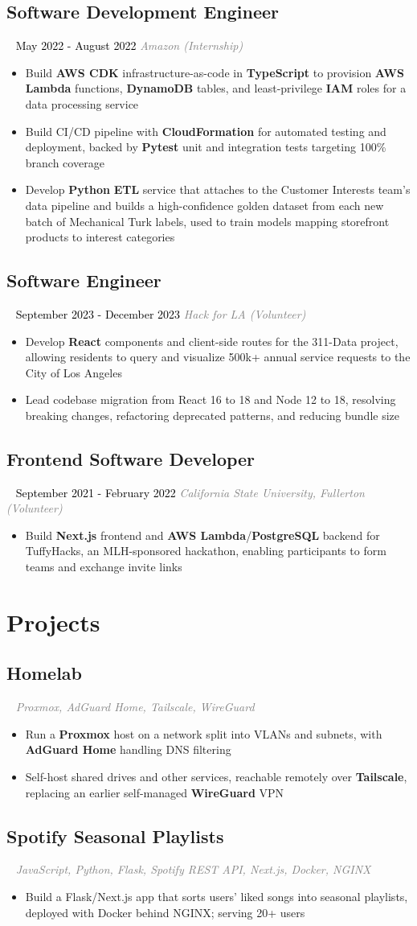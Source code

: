 \documentclass{article}
\newcommand{\resumesection}[3]{
    \subsection*{#1}
    \ 
    \normalsize
    \normalsize
    \hfill
    \textcolor{black}{#3}
    \normalsize
    \newline
    \small
    \textcolor{grey}{\emph{#2}}
}
\newcommand{\projectsection}[3]{
    \subsection*{#1}
    \ 
    \small
    \textcolor{grey}{\emph{#2}}
    \normalsize
    \hfill
    \textcolor{black}{#3}
    \small
}
\begin{document}
\resumesection{Software Development Engineer}{Amazon (Internship)}{May 2022 - August 2022}
\begin{itemize}
	\item Build \textbf{AWS CDK} infrastructure-as-code in \textbf{TypeScript} to provision \textbf{AWS Lambda} functions, \textbf{DynamoDB} tables, and least-privilege \textbf{IAM} roles for a data processing service
	\item Build CI/CD pipeline with \textbf{CloudFormation} for automated testing and deployment, backed by \textbf{Pytest} unit and integration tests targeting 100\% branch coverage
	\item Develop \textbf{Python} \textbf{ETL} service that attaches to the Customer Interests team's data pipeline and builds a high-confidence golden dataset from each new batch of Mechanical Turk labels, used to train models mapping storefront products to interest categories
\end{itemize}
\resumesection{Software Engineer}{Hack for LA (Volunteer)}{September 2023 - December 2023}
\begin{itemize}
	\item Develop \textbf{React} components and client-side routes for the 311-Data project, allowing residents to query and visualize 500k+ annual service requests to the City of Los Angeles
	\item Lead codebase migration from React 16 to 18 and Node 12 to 18, resolving breaking changes, refactoring deprecated patterns, and reducing bundle size
\end{itemize}
\resumesection{Frontend Software Developer}{California State University, Fullerton (Volunteer)}{September 2021 - February 2022}
\begin{itemize}
	\item Build \textbf{Next.js} frontend and \textbf{AWS Lambda}/\textbf{PostgreSQL} backend for TuffyHacks, an MLH-sponsored hackathon, enabling participants to form teams and exchange invite links
\end{itemize}
\section*{Projects}
\projectsection{Homelab}{Proxmox, AdGuard Home, Tailscale, WireGuard}{}
\begin{itemize}
	\item Run a \textbf{Proxmox} host on a network split into VLANs and subnets, with \textbf{AdGuard Home} handling DNS filtering
	\item Self-host shared drives and other services, reachable remotely over \textbf{Tailscale}, replacing an earlier self-managed \textbf{WireGuard} VPN
\end{itemize}
\projectsection{Spotify Seasonal Playlists}{JavaScript, Python, Flask, Spotify REST API, Next.js, Docker, NGINX}{}
\begin{itemize}
	\item Build a Flask/Next.js app that sorts users' liked songs into seasonal playlists, deployed with Docker behind NGINX; serving 20+ users
\end{itemize}
\end{document}
